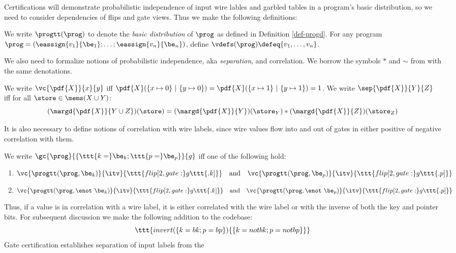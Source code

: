 Certifications will demonstrate probabilistic independence of input
wire lables and garbled tables in a program's basic distribution, so
we need to consider dependencies of flips and gate views. Thus we make
the following definitions:
\begin{definition}
  We write $\progtt(\prog)$ to denote the \emph{basic distribution} of
  $\prog$ as defined in Definition \ref{def-progd}. For any program $\prog =
  (\eassign{v_1}{\be_1};\ldots;\eassign{v_n}{\be_n})$, define
  $\vdefs(\prog) \defeq \{ v_1,\ldots,v_n \}$.
\end{definition}
We also need to formalize notions of probabilistic independence, aka
\emph{separation}, and correlation. We borrow the symbols $*$ and $\sim$
from \cite{barthe2019probabilistic} with the same denotations.
\begin{definition}
  We write $\vc{\pdf{X}}{x}{y}$ iff $\pdf{X}(\{ x \mapsto 0\}\ |\ \{ y \mapsto 0 \}) =
  \pdf{X}(\{ x \mapsto 1\}\ |\ \{ y \mapsto 1 \}) = 1$.
  We write $\sep{\pdf{X}}{Y}{Z}$ iff for all
    $\store \in \mems(X \cup Y)$:
  $$(\margd{\pdf{X}}{Y \cup Z})(\store) =
  (\margd{\pdf{X}}{Y})(\store_Y) * (\margd{\pdf{X}}{Z})(\store_Z)$$ 
\end{definition}
It is also necessary to define notions of correlation with wire
labels, since wire values flow into and out of gates in either
positive of negative correlation with them.
\begin{definition}
  We write $\gc{\prog}{\{ \ttt{k = }\be_{k}; \ttt{p = }\be_{p} \}}{g}$ iff one of the
  following hold:
  \begin{enumerate}[\hspace{5mm}i.]
  \item $\vc{\progtt(\prog,\be_k)}{\itv}{\ttt{flip[2,gate:}g\ttt{.k]}}\quad \text{and} \quad
    \vc{\progtt(\prog,\be_p)}{\itv}{\ttt{flip[2,gate:}g\ttt{.p]}}$
  \item $\vc{\progtt(\prog,\enot\ \be_k)}{\itv}{\ttt{flip[2,gate:}g\ttt{.k]}}\quad \text{and}\quad
    \vc{\progtt(\prog,\enot\ \be_p)}{\itv}{\ttt{flip[2,gate:}g\ttt{.p]}}$
  \end{enumerate}
\end{definition}
Thus, if a value is in correlation with a wire label, it is either
correlated with the wire label or with the inverse of both the key and
pointer bits. For subsequent discussion we make the following addition
to the codebase:
$$
\ttt{invert(\{ k = bk; p = bp \}) \{ \{ k = not bk; p = not bp \} \}}
$$
Gate certification establishes separation of input labels from the
